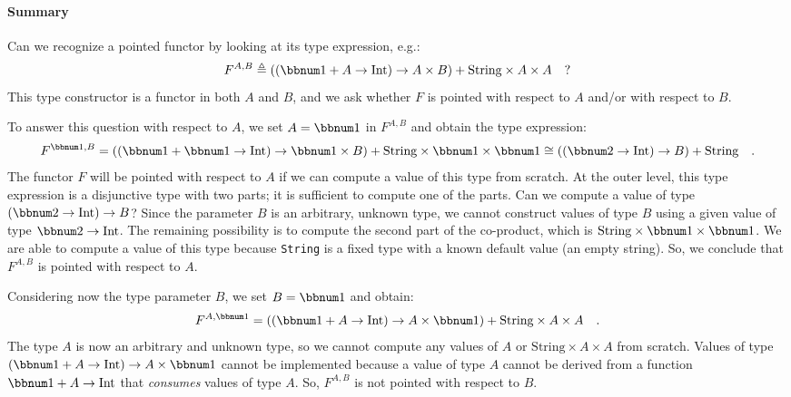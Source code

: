 \paragraph{Summary}

Can we recognize a pointed functor by looking at its type expression,
e.g.:
\[
F^{A,B}\triangleq\left((\bbnum 1+A\rightarrow\text{Int})\rightarrow A\times B\right)+\text{String}\times A\times A\quad?
\]
This type constructor is a functor in both $A$ and $B$, and we ask
whether $F$ is pointed with respect to $A$ and/or with respect to
$B$.

To answer this question with respect to $A$, we set $A=\bbnum 1$
in $F^{A,B}$ and obtain the type expression:
\[
F^{\bbnum 1,B}=\left((\bbnum 1+\bbnum 1\rightarrow\text{Int})\rightarrow\bbnum 1\times B\right)+\text{String}\times\bbnum 1\times\bbnum 1\cong\left(\left(\bbnum 2\rightarrow\text{Int}\right)\rightarrow B\right)+\text{String}\quad.
\]
The functor $F$ will be pointed with respect to $A$ if we can compute
a value of this type from scratch. At the outer level, this type expression
is a disjunctive type with two parts; it is sufficient to compute
one of the parts. Can we compute a value of type $\left(\bbnum 2\rightarrow\text{Int}\right)\rightarrow B$?
Since the parameter $B$ is an arbitrary, unknown type, we cannot
construct values of type $B$ using a given value of type $\bbnum 2\rightarrow\text{Int}$.
The remaining possibility is to compute the second part of the co-product,
which is $\text{String}\times\bbnum 1\times\bbnum 1$. We are able
to compute a value of this type because \lstinline!String! is a fixed
type with a known default value (an empty string). So, we conclude
that $F^{A,B}$ is pointed with respect to $A$.

Considering now the type parameter $B$, we set $B=\bbnum 1$ and
obtain:
\[
F^{A,\bbnum 1}=\left((\bbnum 1+A\rightarrow\text{Int})\rightarrow A\times\bbnum 1\right)+\text{String}\times A\times A\quad.
\]
The type $A$ is now an arbitrary and unknown type, so we cannot compute
any values of $A$ or $\text{String}\times A\times A$ from scratch.
Values of type $(\bbnum 1+A\rightarrow\text{Int})\rightarrow A\times\bbnum 1$
cannot be implemented because a value of type $A$ cannot be derived
from a function $\bbnum 1+A\rightarrow\text{Int}$ that \emph{consumes}
values of type $A$. So, $F^{A,B}$ is not pointed with respect to
$B$.

